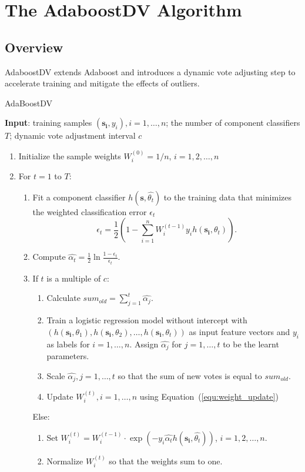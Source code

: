 \section{The AdaboostDV Algorithm}

\subsection{Overview}

AdaboostDV extends Adaboost and introduces a dynamic vote adjusting step to accelerate training and mitigate the effects of outliers.

\begin{algorithm}[h]
	\caption{AdaBoostDV}
	\label{alg:dv}
	\textbf{Input}: training samples $(\boldsymbol{s_i}, y_i), i = 1, \dots, n$; the number of component classifiers $T$;
	dynamic vote adjustment interval $c$
	\begin{enumerate}
		\item
		Initialize the sample weights $W_i^{(0)} = 1/n$, $i = 1, 2, \dots, n$
		
		\item
		For $t = 1$ to $T$:
		\begin{enumerate}
			\item
			Fit a component classifier $h(\boldsymbol{s}, \hat{\theta_t})$ to the training data that minimizes the weighted classification error $\epsilon_t$
			\[
			\epsilon_t = \frac{1}{2}(1 - \sum_{i=1}^{n}W_i^{(t-1)}y_{i}h(\boldsymbol{s_i}, \theta_t)).
			\]
			
			\item
			Compute $\hat{\alpha_t} = \frac{1}{2}\ln\frac{1 - \epsilon_t}{ \epsilon_t}$.
			
			\item
			If $t$ is a multiple of $c$:
			 \begin{enumerate}
			 	\item 
			 	Calculate $sum_{old} = \sum_{j=1}^{t}\hat{\alpha_j}$.
			 	\item 
			 	Train a logistic regression model without intercept with $(h(\boldsymbol{s_i},\theta_1), h(\boldsymbol{s_i},\theta_2), \dots, h(\boldsymbol{s_i},\theta_t))$ as input feature vectors and $y_i$ as labels for  $i = 1, \dots, n$. Assign $\hat{\alpha_j}$ for $j = 1, \dots, t$ to be the learnt parameters.
			 	\item
			 	Scale $\hat{\alpha_j}, j = 1, \dots, t$ so that the sum of new votes is equal to $sum_{old}$. 
			 	\item
			 	Update $W_i^{(t)}, i = 1, \dots, n$ using Equation~(\ref{equ:weight_update})
			 \end{enumerate}  
			 Else:
			\begin{enumerate}
				\item 
				Set $W_i^{(t)} = W_i^{(t-1)} \cdot \exp (-y_i\hat{\alpha_t}h(\boldsymbol{s_i}, \hat{\theta_t}))$, $i = 1, 2, \dots, n$.
				\item
				Normalize $W_i^{(t)}$ so that the weights sum to one. 
			\end{enumerate}
		\end{enumerate}
		

\end{enumerate}
\end{algorithm}
